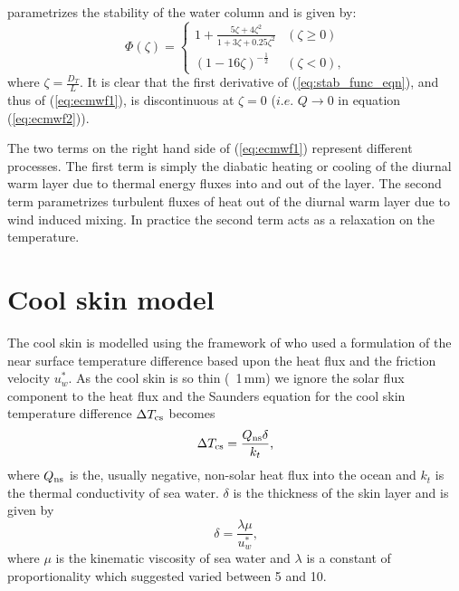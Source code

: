 \documentclass[../tex_main/NEMO_manual]{subfiles}
\begin{document}
parametrizes the stability of the water column and
is given by:
\begin{equation}
\Phi(\zeta) = \left\{ \begin{array}{cc} 1 + \frac{5\zeta +
4\zeta^2}{1+3\zeta+0.25\zeta^2} &(\zeta \ge 0) \\
                                    (1 - 16\zeta)^{-\frac{1}{2}} & (\zeta < 0) \mbox{,}
                                    \end{array} \right. \label{eq:stab_func_eqn}
\end{equation}
where $\zeta=\frac{D_T}{L}$.  It is clear that the first derivative of
(\autoref{eq:stab_func_eqn}), and thus of (\autoref{eq:ecmwf1}),
is discontinuous at $\zeta=0$ ($i.e.$ $Q\rightarrow0$ in equation (\autoref{eq:ecmwf2})).

The two terms on the right hand side of (\autoref{eq:ecmwf1}) represent different processes.
The first term is simply the diabatic heating or cooling of the
diurnal warm
layer due to thermal energy
fluxes into and out of the layer.  The second term
parametrizes turbulent fluxes of heat out of the diurnal warm layer due to wind
induced mixing. In practice the second term acts as a relaxation
on the temperature.


\section{Cool skin model}
\label{sec:cool_skin_sec}


The cool skin is modelled using the framework of \citet{Saunders_JAS82} who used a
formulation of the near surface temperature difference based upon the heat flux and
the friction velocity $u^*_{w}$.  As the cool skin
is so thin (~1\,mm) we ignore the solar flux component to the heat flux and the
Saunders equation for the cool skin temperature difference $\Delta T_{\rm{cs}}$ becomes
\begin{equation}
\label{eq:sunders_eqn}
\Delta T_{\rm{cs}}=\frac{Q_{\rm{ns}}\delta}{k_t} \mbox{,}
\end{equation}
where $Q_{\rm{ns}}$ is the, usually negative, non-solar heat flux into the ocean and
$k_t$ is the thermal conductivity of sea water. $\delta$ is the thickness of the
skin layer and is given by
\begin{equation}
\label{eq:sunders_thick_eqn}
\delta=\frac{\lambda \mu}{u^*_{w}} \mbox{,}
\end{equation}
where $\mu$ is the kinematic viscosity of sea water and $\lambda$ is a constant of
proportionality which \citet{Saunders_JAS82} suggested varied between 5 and 10.
\end{document}
